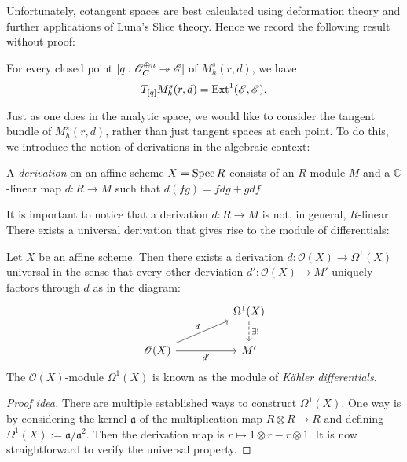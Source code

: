 \documentclass[12pt]{ociamthesis}  %
\begin{document}
Unfortunately, cotangent spaces are best calculated using deformation
theory and further applications of Luna's Slice theory. \cite[Corollary 4.5.2]{huybrechts2010}
Hence we record the following result without proof:

\begin{theorem}
  For every closed point $[q : \mathscr O^{\oplus n}_C \twoheadrightarrow \mathscr E]$ of
  $M^s_h(r,d)$, we have
  \begin{align*}
  T_{[q]} M^s_h(r,d) = \operatorname{Ext}^1(\mathscr E,\mathscr E).
  \end{align*}
\end{theorem}

Just as one does in the analytic space, we would like to consider the
tangent bundle of $M^s_h(r,d)$, rather than just tangent spaces at each
point. To do this, we introduce the notion of derivations in the algebraic
context:

\begin{definition}
  A \emph{derivation} on an affine scheme $X=\operatorname{Spec} R$ consists of
  an $R$-module $M$ and a $\mathbb C$-linear map $d : R \to M$ such
  that $d(fg) = fdg + gdf$.
\end{definition}

It is important to notice that a derivation $d:R\to M$ is not,
in general, $R$-linear. There exists a universal derivation that
gives rise to the module of differentials:

\begin{theorem}\label{thm:kahler_differential}
  Let $X$ be an affine scheme. Then there exists a
  derivation $d : \mathscr O(X) \to \Omega^1(X)$ universal in the sense that
  every other derviation $d' : \mathscr O(X)\to M'$ uniquely factors through
  $d$ as in the diagram:
  \begin{equation*}
    \begin{tikzcd}
      && {\Omega^1(X)} \\
      \mathscr O(X) && {M'}
      \arrow["{\exists!}", dashed, from=1-3, to=2-3]
      \arrow["d", from=2-1, to=1-3]
      \arrow["{d'}"', from=2-1, to=2-3]
    \end{tikzcd}
  \end{equation*}
  The $\mathscr O(X)$-module $\Omega^1(X)$ is known as the module of
  \emph{K\"ahler differentials}.
  \begin{proof}[Proof idea]
    There are multiple established ways to construct $\Omega^1(X)$. One way is by
    considering the kernel $\mathfrak a$ of the multiplication map
    $R\otimes R \to R$ and defining $\Omega^1(X) := \mathfrak a/\mathfrak a^2$. Then the derivation
    map is $r \mapsto 1\otimes r - r \otimes 1$. It is now straightforward
    to verify the universal property.
  \end{proof}
\end{theorem}
\end{document}
